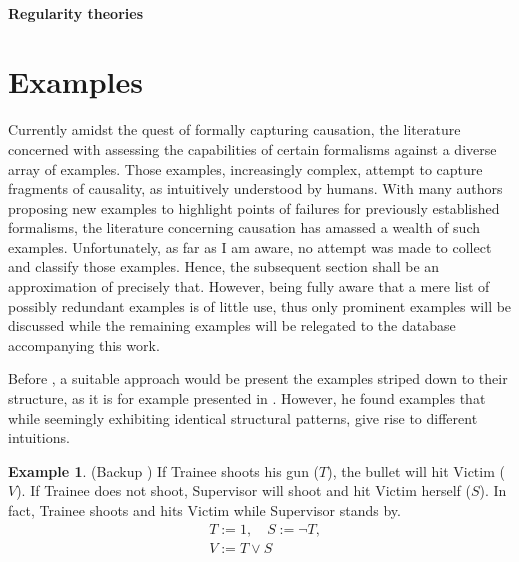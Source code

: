\documentclass[11pt,a4paper]{book}
\theoremstyle{definition}
\theoremstyle{definition}
\newtheorem{example}{Example}[section]
\theoremstyle{definition}
\theoremstyle{remark}
\begin{document}
\paragraph{Regularity theories}






\section{Examples}
\label{sec:causation:examples}
Currently amidst the quest of formally capturing causation, the literature concerned with assessing the capabilities of certain formalisms against a diverse array of examples.
Those examples, increasingly complex, attempt to capture fragments of causality, as intuitively understood by humans. With many authors proposing new examples to highlight points of failures for previously established formalisms, the literature concerning causation has amassed a wealth of such examples. Unfortunately, as far as I am aware, no attempt was made to collect and classify those examples. Hence, the subsequent section shall be an approximation of precisely that. However, being fully aware that a mere list of possibly redundant examples is of little use, thus only prominent examples will be discussed while the remaining examples will be relegated to the database accompanying this work.


Before \cite{Weslake2015partialtheory}, a suitable approach would be present the examples striped down to their structure, as it is for example presented in \cite{hitchcock2009structural,baumgartner2013regularity}. However, 
he found examples that while seemingly exhibiting identical structural patterns, give rise to different intuitions.








\begin{example}(Backup \cite{Weslake2015partialtheory})
If Trainee shoots his gun ($T$), the bullet will hit Victim ($V$). If Trainee does not shoot, Supervisor will shoot and hit Victim herself ($S$). In fact, Trainee shoots and hits Victim while Supervisor stands by.
\begin{equation*}
\begin{split}
&T := 1, \quad S:= \neg T, \\
& V := T \lor S
\end{split}
\end{equation*}
\begin{center}
\end{center}
\end{example}
\end{document}
